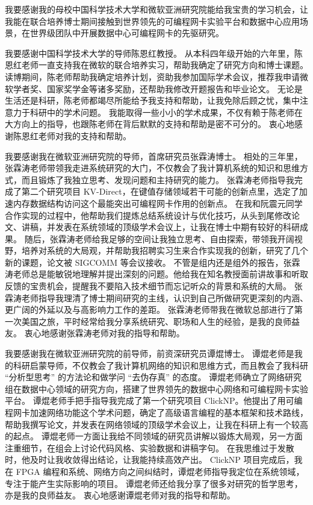 
\begin{acknowledgements}

我要感谢我的母校中国科学技术⼤学和微软亚洲研究院能给我宝贵的学习机会，让我能在联合培养博士期间接触到世界领先的可编程网卡实验平台和数据中心应用场景，在世界级团队中开展数据中心可编程网卡的先驱研究。

我要感谢中国科学技术⼤学的导师陈恩红教授。
从本科四年级开始的六年里，陈恩红老师一直支持我在微软的联合培养实习，帮助我确定了研究方向和博士课题。
读博期间，陈老师帮助我确定培养计划，资助我参加国际学术会议，推荐我申请微软学者奖、国家奖学金等诸多奖励，还帮助我修改开题报告和毕业论文。
无论是生活还是科研，陈老师都竭尽所能给予我⽀持和帮助，让我免除后顾之忧，集中注意⼒于科研中的学术问题。
我能取得一些小小的学术成果，不仅有赖于陈⽼师在大方向上的指导，也跟陈老师在背后默默的⽀持和帮助是密不可分的。
衷心地感谢陈恩红老师对我的支持和帮助。

我要感谢我在微软亚洲研究院的导师，首席研究员张霖涛博士。
相处的三年里，张霖涛老师带领我走进系统研究的大门，不仅教会了我计算机系统的知识和思维方式，而且锻炼了我独立思考、发现问题和主持研究的能力。
张霖涛老师指导我完成了第二个研究项目 KV-Direct，在键值存储领域若干可能的创新点里，选定了加速内存数据结构访问这个最能突出可编程网卡作用的创新点。
在我和阮震元同学合作实现的过程中，他帮助我们提炼总结系统设计与优化技巧，从头到尾修改论文、讲稿，并发表在系统领域的顶级学术会议上，让我在博士中期有较好的科研成果。
随后，张霖涛老师给我足够的空间让我独立思考、自由探索，带领我开阔视野，培养对系统的大局观，并帮助我招聘实习生来合作实现我的创新，研究了几个新的课题，论文被 SIGCOMM 等会议接收。
不管是组内还是组外的报告，张霖涛老师总是能敏锐地理解并提出深刻的问题。他给我在知名教授面前讲故事和听取反馈的宝贵机会，提醒我不要陷入技术细节而忘记听众的背景和系统的大局。
张霖涛老师指导我理清了博士期间研究的主线，认识到自己所做研究更深刻的内涵、更广阔的外延以及与高影响力工作的差距。
张霖涛老师带我在微软总部进行了第一次美国之旅，平时经常给我分享系统研究、职场和人生的经验，是我的良师益友。
衷心地感谢张霖涛老师对我的指导和帮助。

我要感谢我在微软亚洲研究院的前导师，前资深研究员谭焜博⼠。
谭焜老师是我的科研启蒙导师，不仅教会了我计算机⽹络的知识和思维⽅式，⽽且教会了我科研 ``分析型思考'' 的⽅法论和做学问 ``去伪存真'' 的态度。
谭焜老师确立了网络研究组在数据中心领域的研究方向，搭建了世界领先的数据中心网络和可编程网卡实验平台。
谭焜老师手把手指导我完成了第一个研究项目 ClickNP。他提出了用可编程网卡加速网络功能这个学术问题，确定了高级语言编程的基本框架和技术路线，帮助我撰写论文，并发表在网络领域的顶级学术会议上，让我在科研上有一个较高的起点。
谭焜老师一方面让我给不同领域的研究员讲解以锻炼大局观，另一方面注重细节，在组会上讨论代码风格、实验数据和讲稿字句。
在我思维过于发散时，他及时让我收敛得出结论，让我能持续高效产出。
ClickNP 项目完成后，我在 FPGA 编程和系统、网络方向之间纠结时，谭焜老师指导我定位在系统领域，专注于能产生实际影响的项目。
谭焜老师还给我分享了很多对研究的哲学思考，亦是我的良师益友。
衷⼼地感谢谭焜⽼师对我的指导和帮助。



\end{acknowledgements}
